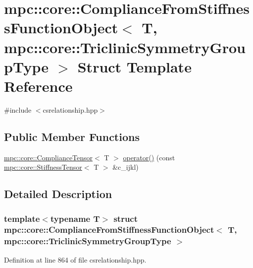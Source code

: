 \hypertarget{structmpc_1_1core_1_1_compliance_from_stiffness_function_object_3_01_t_00_01mpc_1_1core_1_1_triclinic_symmetry_group_type_01_4}{}\section{mpc\+:\+:core\+:\+:Compliance\+From\+Stiffness\+Function\+Object$<$ T, mpc\+:\+:core\+:\+:Triclinic\+Symmetry\+Group\+Type $>$ Struct Template Reference}
\label{structmpc_1_1core_1_1_compliance_from_stiffness_function_object_3_01_t_00_01mpc_1_1core_1_1_triclinic_symmetry_group_type_01_4}


{\ttfamily \#include $<$csrelationship.\+hpp$>$}

\subsection*{Public Member Functions}
\begin{DoxyCompactItemize}
\item 
\mbox{\hyperlink{structmpc_1_1core_1_1_compliance_tensor}{mpc\+::core\+::\+Compliance\+Tensor}}$<$ T $>$ \mbox{\hyperlink{structmpc_1_1core_1_1_compliance_from_stiffness_function_object_3_01_t_00_01mpc_1_1core_1_1_triclinic_symmetry_group_type_01_4_a533db9ba78f6818a61eeb5da0868e256}{operator()}} (const \mbox{\hyperlink{structmpc_1_1core_1_1_stiffness_tensor}{mpc\+::core\+::\+Stiffness\+Tensor}}$<$ T $>$ \&c\+\_\+ijkl)
\end{DoxyCompactItemize}


\subsection{Detailed Description}
\subsubsection*{template$<$typename T$>$\newline
struct mpc\+::core\+::\+Compliance\+From\+Stiffness\+Function\+Object$<$ T, mpc\+::core\+::\+Triclinic\+Symmetry\+Group\+Type $>$}



Definition at line 864 of file csrelationship.\+hpp.



